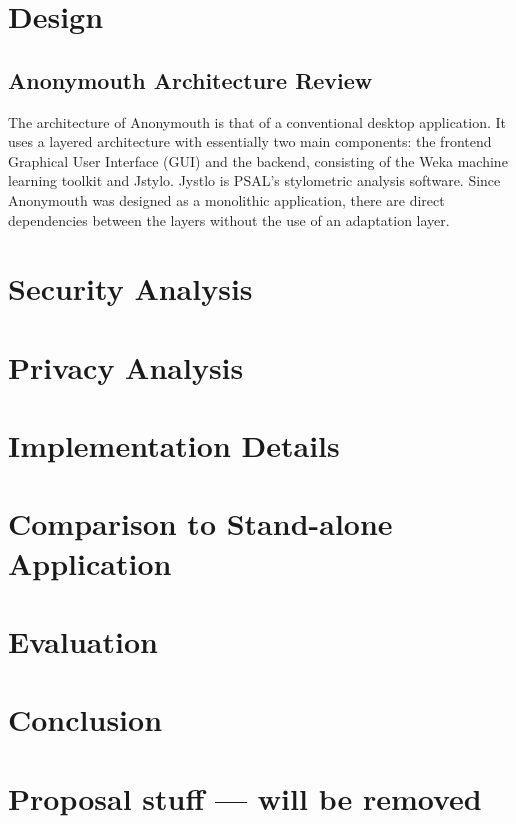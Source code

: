\documentclass[letterpaper]{article}
\begin{document}
\section{Design}

\subsection{Anonymouth Architecture Review}

The architecture of Anonymouth is that of a conventional desktop
application.  It uses a layered architecture with essentially two main
components: the frontend Graphical User Interface (GUI) and the
backend, consisting of the Weka machine learning toolkit and Jstylo.
Jystlo is PSAL's stylometric analysis software.   Since Anonymouth was
designed as a monolithic application, there are direct dependencies
between the layers without the use of an adaptation layer.

\section{Security Analysis}

\section{Privacy Analysis}

\section{Implementation Details}

\section{Comparison to Stand-alone Application}

\section{Evaluation}

\section{Conclusion}


\section{Proposal stuff --- will be removed}
\end{document}

